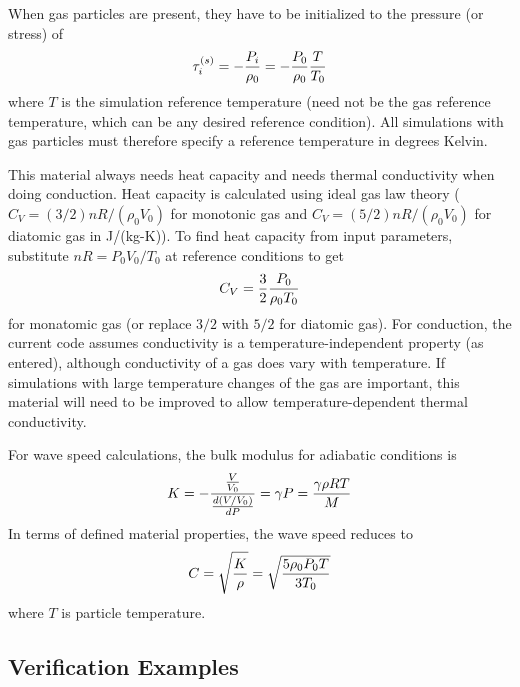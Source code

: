 \documentclass[11pt]{book}
\begin{document}
When gas particles are present, they have to be initialized to the pressure (or stress) of
\begin{equation}
     \tau_i^{(s)} =  - {P_i\over \rho_0} = - {P_0\over \rho_0} {T\over T_0}
\end{equation}
where $T$ is the simulation reference temperature (need not be the gas reference temperature, which can be any desired reference condition). All simulations with gas particles must therefore specify a reference temperature in degrees Kelvin.

This material always needs heat capacity and needs thermal conductivity when doing conduction. Heat capacity is calculated using ideal gas law theory ($C_V=(3/2)nR/(\rho_0 V_0)$ for monotonic gas and $C_V=(5/2)nR/(\rho_0 V_0)$ for diatomic gas in J/(kg-K)). To find heat capacity from input parameters, substitute $nR = P_0V_0/T_0$ at reference conditions to get
\begin{equation}
     C_V =  {3\over 2} {P_0 \over \rho_0T_0}
\end{equation}
for monatomic gas (or replace $3/2$ with $5/2$ for diatomic gas). For conduction, the current code assumes conductivity is a temperature-independent property (as entered), although conductivity of a gas does vary with temperature. If simulations with large temperature changes of the gas are important, this material will need to be improved to allow temperature-dependent thermal conductivity.

For wave speed calculations, the bulk modulus for adiabatic conditions is
\begin{equation}
   K = -{{V\over V_0} \over {d(V/V_0)\over dP}} = \gamma P = {\gamma\rho R T\over M}
\end{equation}
In terms of defined material properties, the wave speed reduces to
\begin{equation}
   C = \sqrt{K\over\rho} = \sqrt{{5\rho_0P_0T\over 3T_0}}
\end{equation}
where $T$ is particle temperature.


\subsection{Verification Examples}
\end{document}
